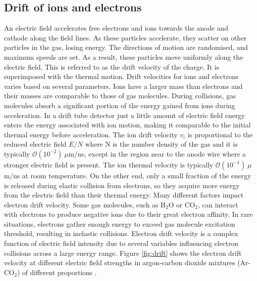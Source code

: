 \subsection{Drift of ions and electrons}
An electric field accelerates free electrons and ions towards the anode and cathode 
along the field lines. As these particles accelerate, they scatter on other particles in the gas, 
losing energy. The directions of motion are randomised, and maximum speeds are set. As a result, 
these particles move uniformly along the electric field. This is referred to as the drift velocity of the 
charge. It is superimposed with the thermal motion.
Drift velocities for ions and electrons varies based on several parameters. Ions have a larger mass 
than electrons and their masses are comparable to those of gas molecules. During collisions, gas 
molecules absorb a significant portion of the energy gained from ions during acceleration. In a drift 
tube detector just a little amount of electric field energy enters the energy associated with ion motion, 
making it comparable to the initial thermal energy before acceleration. 
The ion drift velocity $v_i$ is proportional to the reduced electric field $E/N$ where N is the number density of the gas 
and it is typically $\mathcal{O}(10^{-2}) \ \mu$m/ns, 
except in the region near to the anode wire where a stronger 
electric field is present. The ion thermal velocity is typically $\mathcal{O}(10^{-1}) \ \mu$m/ns at room temperature.
On the other end, only a small fraction of the energy is released during elastic collision from electrons, 
so they acquire more energy from the electric field than their thermal energy.
Many different factors impact electron drift velocity. Some gas molecules, such as H$_2$O or CO$_2$, 
can interact with electrons to produce negative ions due to their great electron affinity. In rare situations, 
electrons gather enough energy to exceed gas molecule excitation threshold, resulting in inelastic collisions. 
Electron drift velocity is a complex function of electric field intensity due to several variables influencing 
electron collisions across a large energy range. Figure \ref{fig:drift} shows the electron drift
velocity at different electric field strengths in argon-carbon dioxide mixtures (Ar-CO$_2$) of different
proportions \cite{ZHAO1994485}.
